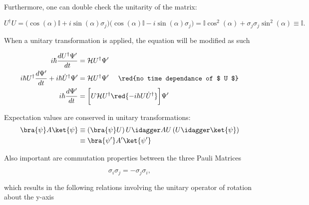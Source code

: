  \noindent Furthermore, one can double check the unitarity of the matrix:

 \begin{equation}\label{uniunitary}
   U^{\dagger}U =\bigg( \cos(\alpha)\mathbb{I}+i\sin(\alpha)\sigma_j\bigg)\bigg( \cos(\alpha)\mathbb{I}-i\sin(\alpha)\sigma_j\bigg) = \mathbb{I}\cos^2(\alpha)+\sigma_j\sigma_j\sin^2(\alpha)\equiv\mathbb{I}.
 \end{equation}

 \noindent When  a unitary transformation  is applied, the  \schrodinger equation
 will be modified as such

 \begin{equation}\label{duninewschroer}
   \begin{aligned}
     i\hbar\frac{dU^{\dagger}\Psi'}{dt} & = \mathcal{H}U^{\dagger}\Psi'\\
     i\hbar{U}^{\dagger}\frac{d\Psi'}{dt} + i\hbar\dot{U}^{\dagger}{\Psi'} & = \mathcal{H}U^{\dagger}\Psi' \quad\text{ \red{no time dependance of $ U $}}\\
     i\hbar\frac{d\Psi'}{dt} & = \bigg[U\mathcal{H}U^{\dagger} \red{-i\hbar U\dot{U}^{\dagger}}\bigg]\Psi'\\
   \end{aligned}
 \end{equation}

\begin{framed}\noindent
  Expectation values are conserved in unitary transformations:
  \[
    \begin{aligned}
      \bra{\psi}A\ket{\psi} & \equiv \left(\bra{\psi}U\right)U\idagger AU\left(U\idagger\ket{\psi}\right)\\
      & \equiv \bra{\psi'}A'\ket{\psi'}
    \end{aligned}
  \]
\end{framed}

\noindent Also important are commutation properties between the three Pauli Matrices

 \begin{equation}\label{uniComm}
   \sigma_i\sigma_j=-\sigma_j\sigma_i,
 \end{equation}

 \noindent which results in the following relations involving the unitary operator of rotation about the y-axis

